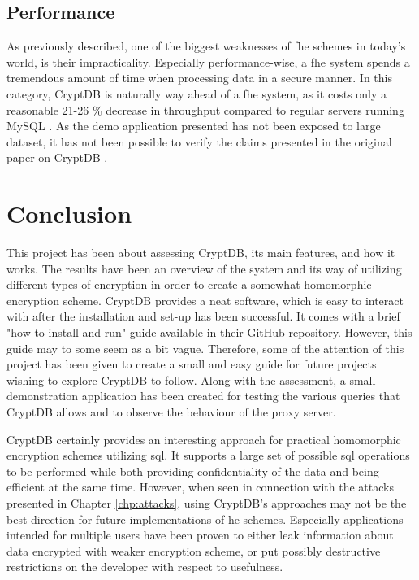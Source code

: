 \subsection{Performance}

As previously described, one of the biggest weaknesses of \gls{fhe} schemes in today's world, is their impracticality. Especially performance-wise, a \gls{fhe} system spends a tremendous amount of time when processing data in a secure manner. In this category, CryptDB is naturally way ahead of a \gls{fhe} system, as it costs only a reasonable 21-26 \% decrease in throughput compared to regular servers running MySQL \cite{CryptDB_Main_Paper}. As the demo application presented has not been exposed to large dataset, it has not been possible to verify the claims presented in the original paper on CryptDB \citep{CryptDB_Main_Paper}.

\section{Conclusion}

This project has been about assessing CryptDB, its main features, and how it works. The results have been an overview of the system and its way of utilizing different types of encryption in order to create a somewhat homomorphic encryption scheme. CryptDB provides a neat software, which is easy to interact with after the installation and set-up has been successful. It comes with a brief "how to install and run" guide available in their GitHub repository. However, this guide may to some seem as a bit vague. Therefore, some of the attention of this project has been given to create a small and easy guide for future projects wishing to explore CryptDB to follow. Along with the assessment, a small demonstration application has been created for testing the various queries that CryptDB allows and to observe the behaviour of the proxy server.


CryptDB certainly provides an interesting approach for practical homomorphic encryption schemes utilizing \gls{sql}. It supports a large set of possible \gls{sql} operations to be performed while both providing confidentiality of the data and being efficient at the same time. However, when seen in connection with the attacks presented in Chapter \ref{chp:attacks}, using CryptDB's approaches may not be the best direction for future implementations of \gls{he} schemes. Especially applications intended for multiple users have been proven to either leak information about data encrypted with weaker encryption scheme, or put possibly destructive restrictions on the developer with respect to usefulness. 

